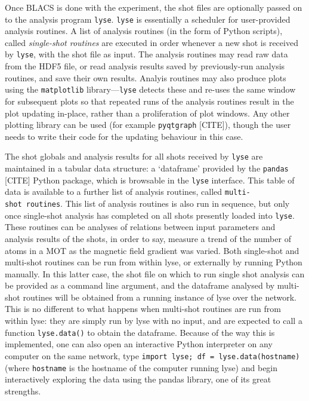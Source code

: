 Once BLACS is done with the experiment, the shot files are optionally passed on to the analysis program \texttt{lyse}. \texttt{lyse} is essentially a scheduler for user-provided analysis routines. A list of analysis routines (in the form of Python scripts), called \emph{single-shot routines} are executed in order whenever a new shot is received by \texttt{lyse}, with the shot file as input. The analysis routines may read raw data from the HDF5 file, or read analysis results saved by previously-run analysis routines, and save their own results. Analyis routines may also produce plots using the \texttt{matplotlib} library---\texttt{lyse} detects these and re-uses the same window for subsequent plots so that repeated runs of the analysis routines result in the plot updating in-place, rather than a proliferation of plot windows. Any other plotting library can be used (for example \texttt{pyqtgraph} [CITE]), though the user needs to write their code for the updating behaviour in this case.

The shot globals and analysis results for all shots received by \texttt{lyse} are maintained in a tabular data structure: a `dataframe' provided by the \texttt{pandas} [CITE] Python package, which is browsable in the \texttt{lyse} interface. This table of data is available to a further list of analysis routines, called \texttt{multi-shot\ routines}. This list of analysis routines is also run in sequence, but only once single-shot analysis has completed on all shots presently loaded into \texttt{lyse}. These routines can be analyses of relations between input parameters and analysis results of the shots, in order to say, measure a trend of the number of atoms in a MOT as the magnetic field gradient was varied. Both single-shot and multi-shot routines can be run from within lyse, or externally by running Python manually. In this latter case, the shot file on which to run single shot analysis can be provided as a command line argument, and the dataframe analysed by multi-shot routines will be obtained from a running instance of lyse over the network. This is no different to what happens when multi-shot routines are run from within lyse: they are simply run by lyse with no input, and are expected to call a function \texttt{lyse.data()} to obtain the dataframe. Because of the way this is implemented, one can also open an interactive Python interpreter on any computer on the same network, type \texttt{import lyse; df = lyse.data(hostname)} (where \texttt{hostname} is the hostname of the computer running lyse) and begin interactively exploring the data using the pandas library, one of its great strengths.

